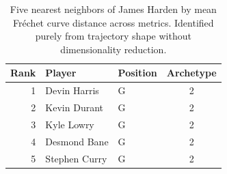 \begin{table}[htbp]
  \centering\small
  \begin{tabular}{rllc}
    \toprule
    Rank & Player & Position & Archetype \\
    \midrule
    1 & Devin Harris & G & 2 \\
    2 & Kevin Durant & G & 2 \\
    3 & Kyle Lowry & G & 2 \\
    4 & Desmond Bane & G & 2 \\
    5 & Stephen Curry & G & 2 \\
    \bottomrule
  \end{tabular}
  \caption{Five nearest neighbors of James Harden by mean Fr\'{e}chet curve distance across metrics. Identified purely from trajectory shape without dimensionality reduction.}
  \label{tab:James_Harden_frechet_curve_neighbors}
\end{table}

